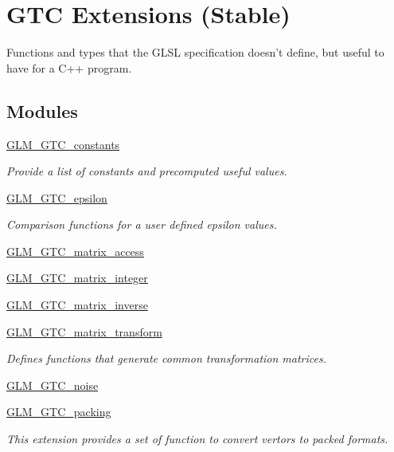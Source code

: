 \hypertarget{group__gtc}{\section{G\-T\-C Extensions (Stable)}
\label{group__gtc}
}


Functions and types that the G\-L\-S\-L specification doesn't define, but useful to have for a C++ program.  


\subsection*{Modules}
\begin{DoxyCompactItemize}
\item 
\hyperlink{group__gtc__constants}{G\-L\-M\-\_\-\-G\-T\-C\-\_\-constants}
\begin{DoxyCompactList}\small\item\em Provide a list of constants and precomputed useful values. \end{DoxyCompactList}\item 
\hyperlink{group__gtc__epsilon}{G\-L\-M\-\_\-\-G\-T\-C\-\_\-epsilon}
\begin{DoxyCompactList}\small\item\em Comparison functions for a user defined epsilon values. \end{DoxyCompactList}\item 
\hyperlink{group__gtc__matrix__access}{G\-L\-M\-\_\-\-G\-T\-C\-\_\-matrix\-\_\-access}
\item 
\hyperlink{group__gtc__matrix__integer}{G\-L\-M\-\_\-\-G\-T\-C\-\_\-matrix\-\_\-integer}
\item 
\hyperlink{group__gtc__matrix__inverse}{G\-L\-M\-\_\-\-G\-T\-C\-\_\-matrix\-\_\-inverse}
\item 
\hyperlink{group__gtc__matrix__transform}{G\-L\-M\-\_\-\-G\-T\-C\-\_\-matrix\-\_\-transform}
\begin{DoxyCompactList}\small\item\em Defines functions that generate common transformation matrices. \end{DoxyCompactList}\item 
\hyperlink{group__gtc__noise}{G\-L\-M\-\_\-\-G\-T\-C\-\_\-noise}
\item 
\hyperlink{group__gtc__packing}{G\-L\-M\-\_\-\-G\-T\-C\-\_\-packing}
\begin{DoxyCompactList}\small\item\em This extension provides a set of function to convert vertors to packed formats. \end{DoxyCompactList}\item 

\end{DoxyCompactItemize}
